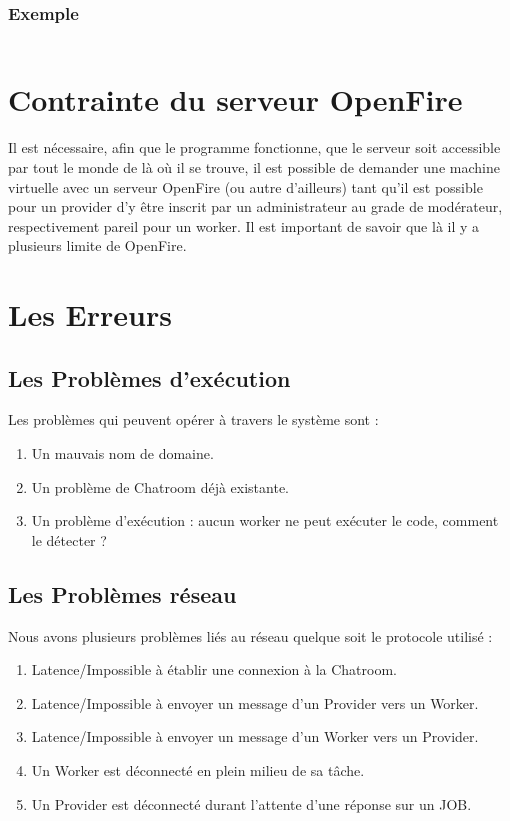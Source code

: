 \documentclass[11pt]{article}
\begin{document}
\subsubsection{Exemple}
\inputminted{perl}{../Echantillon_Script_build/build.pl}
\newpage
\section{Contrainte du serveur OpenFire }
Il est nécessaire, afin que le programme fonctionne, que le serveur soit accessible par tout le monde de là où il se trouve, il est possible de demander une machine virtuelle avec un serveur OpenFire (ou autre d’ailleurs) tant qu'il est possible pour un provider d'y être inscrit par un administrateur au grade de modérateur, respectivement pareil pour un worker. 
Il est important de savoir que là il y a plusieurs limite de OpenFire.
\newpage
\section{Les Erreurs} 
\subsection{Les Problèmes d'exécution}
Les problèmes qui peuvent opérer à travers le système sont : 
\begin{enumerate}
\item Un mauvais nom de domaine. 
\item Un problème de Chatroom déjà existante.
\item Un problème d'exécution : aucun worker ne peut exécuter le code, comment le détecter ?

\end{enumerate}  

\newpage
\subsection{Les Problèmes réseau}
Nous avons plusieurs problèmes liés au réseau quelque soit le protocole utilisé :
\begin{enumerate}
\item Latence/Impossible à établir une connexion à la Chatroom.
\item Latence/Impossible à envoyer un  message d'un Provider vers un Worker.
\item Latence/Impossible à envoyer un  message d'un Worker vers un Provider.
\item Un Worker est déconnecté en plein milieu de sa tâche.
\item Un Provider est déconnecté durant l'attente d'une réponse sur un JOB.
\end{enumerate}
\end{document}
